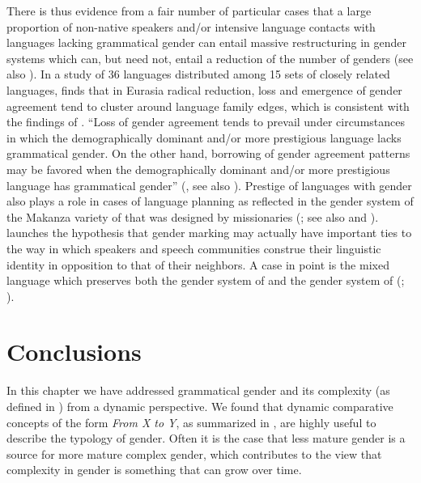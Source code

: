 \documentclass[output=collectionpaper]{langsci/langscibook}
\begin{document}
There is thus evidence from a fair number of particular cases that a large proportion of non-native speakers and/or intensive language contacts with languages lacking grammatical gender can entail massive restructuring in gender systems which can, but need not, entail a reduction of the number of genders (see also \citealt[24]{Trudgill2011}). In a study of 36 languages distributed among 15 sets of closely related languages, \cite{DiGarboinpreparation} finds that in Eurasia radical reduction, loss and emergence of gender agreement tend to cluster around language family edges, which is consistent with the findings of \cite{Nichols2003}. ``Loss of gender agreement tends to prevail under circumstances in which the demographically dominant and/or more prestigious language lacks grammatical gender. On the other hand, borrowing of gender agreement patterns may be favored when the demographically dominant and/or more prestigious language has grammatical gender'' (\citealt{DiGarboinpreparation}, see also ). Prestige of languages with gender also plays a role in cases of language planning as reflected in the gender system of the Makanza variety of  that was designed by missionaries (\citealt{Meeuwis2013}; see also \citealt{DiGarboinpreparation} and ). \cite{DiGarboinpreparation} launches the hypothesis that gender marking may actually have important ties to the way in which speakers and speech communities construe their linguistic identity in opposition to that of their neighbors. A case in point is the mixed language  which preserves both the gender system of  and the gender system of  (\citealt{Bakker1997}; \citealt{DiGarboinpreparation}).


\section{Conclusions}
\label{sec:WDG:12}

In this chapter we have addressed grammatical gender and its complexity (as defined in ) from a dynamic perspective. We found that dynamic comparative concepts of the form \textit{From X to Y}, as summarized in , are highly useful to describe the typology of gender. Often it is the case that less mature gender is a source for more mature complex gender, which contributes to the view that complexity in gender is something that can grow over time.
\end{document}
